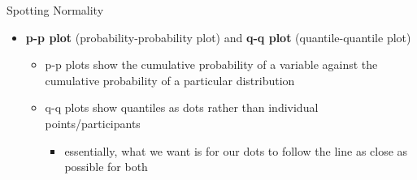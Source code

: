 \documentclass[
  ignorenonframetext,
]{beamer}
\providecommand{\tightlist}{%
  \setlength{\itemsep}{0pt}\setlength{\parskip}{0pt}}
\begin{document}
\begin{frame}{Spotting Normality}
\protect\hypertarget{spotting-normality}{}
\begin{itemize}
\item
  \textbf{p-p plot} (probability-probability plot) and \textbf{q-q plot}
  (quantile-quantile plot)

  \begin{itemize}
  \item
    p-p plots show the cumulative probability of a variable against the
    cumulative probability of a particular distribution
  \item
    q-q plots show quantiles as dots rather than individual
    points/participants

    \begin{itemize}
    \tightlist
    \item
      essentially, what we want is for our dots to follow the line as
      close as possible for both
    \end{itemize}
  \end{itemize}
\end{itemize}
\end{frame}
\end{document}
